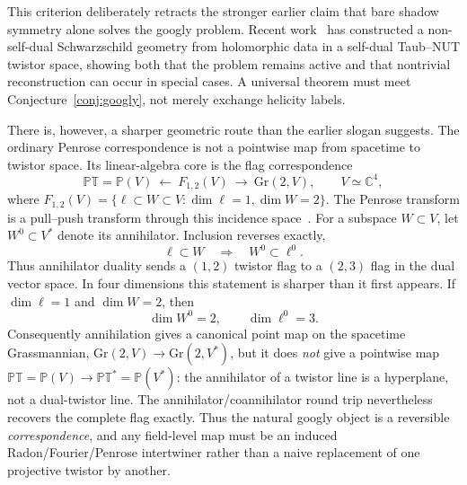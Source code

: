 \documentclass[11pt]{article}
\newcommand{\Gr}{\mathrm{Gr}}
\theoremstyle{definition}\newtheorem{definition}[theorem]{Definition}
\theoremstyle{remark}\newtheorem{remark}[theorem]{Remark}\newtheorem{conjecture}[theorem]{Conjecture}
\begin{document}
This criterion deliberately retracts the stronger earlier claim that bare shadow symmetry alone solves the googly problem. Recent work~\cite{Adamo2026} has constructed a non-self-dual Schwarzschild geometry from holomorphic data in a self-dual Taub--NUT twistor space, showing both that the problem remains active and that nontrivial reconstruction can occur in special cases. A universal theorem must meet Conjecture~\ref{conj:googly}, not merely exchange helicity labels.

There is, however, a sharper geometric route than the earlier slogan suggests. The ordinary Penrose correspondence is not a pointwise map from spacetime to twistor space. Its linear-algebra core is the flag correspondence
\begin{equation}
 \mathbb{PT}=\mathbb P(V)\ \longleftarrow\ F_{1,2}(V)\ \longrightarrow\ \Gr(2,V),\qquad V\simeq\mathbb C^4,
\end{equation}
where $F_{1,2}(V)=\{\ell\subset W\subset V:\dim\ell=1,\dim W=2\}$. The Penrose transform is a pull--push transform through this incidence space~\cite{WardWells}. For a subspace $W\subset V$, let $W^0\subset V^*$ denote its annihilator. Inclusion reverses exactly,
\begin{equation}\label{eq:annihilatorreverse}
 \ell\subset W\quad\Longrightarrow\quad W^0\subset\ell^0.
\end{equation}
Thus annihilator duality sends a $(1,2)$ twistor flag to a $(2,3)$ flag in the dual vector space. In four dimensions this statement is sharper than it first appears. If $\dim \ell=1$ and $\dim W=2$, then
\begin{equation}\label{eq:annihilatordims}
 \dim W^0=2,\qquad \dim \ell^0=3.
\end{equation}
Consequently annihilation gives a canonical point map on the spacetime Grassmannian, $\Gr(2,V)\to\Gr(2,V^*)$, but it does \emph{not} give a pointwise map $\mathbb{PT}=\mathbb P(V)\to\mathbb{PT}^*=\mathbb P(V^*)$: the annihilator of a twistor line is a hyperplane, not a dual-twistor line. The annihilator/coannihilator round trip nevertheless recovers the complete flag exactly. Thus the natural googly object is a reversible \emph{correspondence}, and any field-level map must be an induced Radon/Fourier/Penrose intertwiner rather than a naive replacement of one projective twistor by another.
\end{document}
